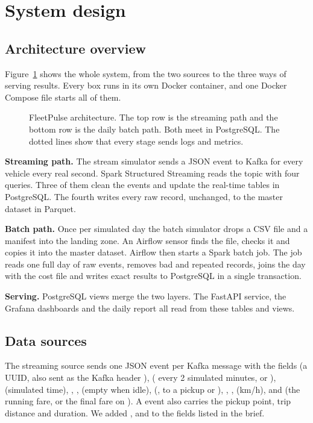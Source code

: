 \section{System design}

\subsection{Architecture overview}
Figure~\ref{fig:architecture} shows the whole system, from the two sources to the three ways of serving
results. Every box runs in its own Docker container, and one Docker Compose file starts all of them.

\begin{figure}[!htb]
\centering

\caption{FleetPulse architecture. The top row is the streaming path and the bottom row is the daily batch
path. Both meet in PostgreSQL. The dotted lines show that every stage sends logs and metrics.}
\label{fig:architecture}
\end{figure}

\textbf{Streaming path.} The stream simulator sends a JSON event to Kafka for every vehicle every real
second. Spark Structured Streaming reads the topic with four queries. Three of them clean the events and
update the real-time tables in PostgreSQL. The fourth writes every raw record, unchanged, to the master
dataset in Parquet.

\textbf{Batch path.} Once per simulated day the batch simulator drops a CSV file and a manifest into the
landing zone. An Airflow sensor finds the file, checks it and copies it into the master dataset. Airflow
then starts a Spark batch job. The job reads one full day of raw events, removes bad and repeated records,
joins the day with the cost file and writes exact results to PostgreSQL in a single transaction.

\textbf{Serving.} PostgreSQL views merge the two layers. The FastAPI service, the Grafana dashboards and the
daily report all read from these tables and views.

\subsection{Data sources}
The streaming source sends one JSON event per Kafka message with the fields  (a UUID, also
sent as the Kafka header ),  ( every 2 simulated minutes,
 or ),  (simulated time), ,
,  (empty when idle),  (,  to a
pickup or ), , ,  (km/h),  and
 (the running fare, or the final fare on ). A  event also carries
the pickup point, trip distance and duration. We added ,  and
 to the fields listed in the brief.

